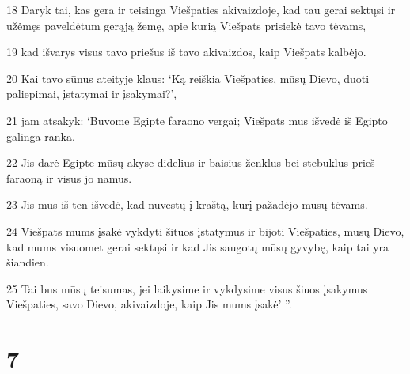 \par 18 Daryk tai, kas gera ir teisinga Viešpaties akivaizdoje, kad tau gerai sektųsi ir užėmęs paveldėtum gerąją žemę, apie kurią Viešpats prisiekė tavo tėvams, 
\par 19 kad išvarys visus tavo priešus iš tavo akivaizdos, kaip Viešpats kalbėjo. 
\par 20 Kai tavo sūnus ateityje klaus: ‘Ką reiškia Viešpaties, mūsų Dievo, duoti paliepimai, įstatymai ir įsakymai?’, 
\par 21 jam atsakyk: ‘Buvome Egipte faraono vergai; Viešpats mus išvedė iš Egipto galinga ranka. 
\par 22 Jis darė Egipte mūsų akyse didelius ir baisius ženklus bei stebuklus prieš faraoną ir visus jo namus. 
\par 23 Jis mus iš ten išvedė, kad nuvestų į kraštą, kurį pažadėjo mūsų tėvams. 
\par 24 Viešpats mums įsakė vykdyti šituos įstatymus ir bijoti Viešpaties, mūsų Dievo, kad mums visuomet gerai sektųsi ir kad Jis saugotų mūsų gyvybę, kaip tai yra šiandien. 
\par 25 Tai bus mūsų teisumas, jei laikysime ir vykdysime visus šiuos įsakymus Viešpaties, savo Dievo, akivaizdoje, kaip Jis mums įsakė’ ”.



\chapter{7}


